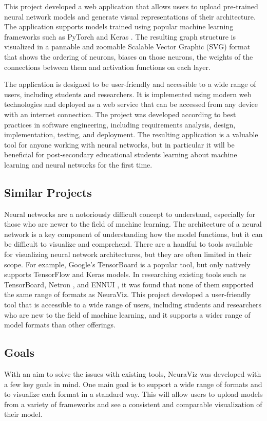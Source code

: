 This project developed a web application that allows users to upload pre-trained neural network models and generate visual representations of their architecture. The application supports models trained using popular machine learning frameworks such as PyTorch \cite{pytorch} and Keras \cite{keras}. The resulting graph structure is visualized in a pannable and zoomable Scalable Vector Graphic (SVG) format that shows the ordering of neurons, biases on those neurons, the weights of the connections between them and activation functions on each layer.

The application is designed to be user-friendly and accessible to a wide range of users, including students and researchers. It is implemented using modern web technologies and deployed as a web service that can be accessed from any device with an internet connection. The project was developed according to best practices in software engineering, including requirements analysis, design, implementation, testing, and deployment. The resulting application is a valuable tool for anyone working with neural networks, but in particular it will be beneficial for post-secondary educational students learning about machine learning and neural networks for the first time.

\subsection{Similar Projects}
Neural networks are a notoriously difficult concept to understand, especially for those who are newer to the field of machine learning. The architecture of a neural network is a key component of understanding how the model functions, but it can be difficult to visualize and comprehend. There are a handful to tools available for visualizing neural network architectures, but they are often limited in their scope. For example, Google's TensorBoard \cite{tensorboard} is a popular tool, but only natively supports TensorFlow and Keras models. In researching existing tools such as TensorBoard, Netron \cite{netron}, and ENNUI \cite{ennui}, it was found that none of them supported the same range of formats as NeuraViz. This project developed a user-friendly tool that is accessible to a wide range of users, including students and researchers who are new to the field of machine learning, and it supports a wider range of model formats than other offerings.

\subsection{Goals}
With an aim to solve the issues with existing tools, NeuraViz was developed with a few key goals in mind. One main goal is to support a wide range of formats and to visualize each format in a standard way. This will allow users to upload models from a variety of frameworks and see a consistent and comparable visualization of their model.

